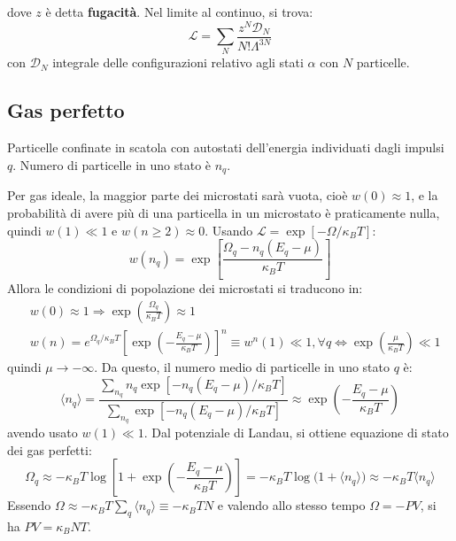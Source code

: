 \documentclass[10pt, a4paper]{scrartcl}
\numberwithin{equation}{subsection}
\theoremstyle{style1}
\begin{document}
dove $z$ \`e detta \textbf{fugacit\`a}. Nel limite al continuo, si trova:
\begin{equation}
	\mathscr{L}= \sum_{N}^{} \frac{z^N \mathscr{D}_N}{N! \Lambda ^{3N} }
\end{equation}
con $\mathscr{D}_N$ integrale delle configurazioni relativo agli stati $\alpha $ con $N$ particelle.


\subsection{Gas perfetto}
Particelle confinate in scatola con autostati dell'energia individuati dagli impulsi $q$. Numero di particelle in uno stato \`e $n_q$. 

Per gas ideale, la maggior parte dei microstati sar\`a vuota, cio\`e $w(0) \approx 1$, e la probabilit\`a di avere pi\`u di una particella in un microstato \`e praticamente nulla, quindi $w(1) \ll 1$ e $w(n\ge 2) \approx 0$. Usando $\mathscr{L} = \exp \left[ - \Omega / \kappa _B T \right] $:
\begin{equation}
	w(n_q) = \exp \left[ \frac{\Omega _q - n_q (E_q - \mu )}{\kappa _B T} \right] 
\end{equation}
Allora le condizioni di popolazione dei microstati si traducono in:
\begin{equation}
	\begin{split}
		&w(0) \approx 1 \Rightarrow \exp \left(\frac{\Omega _q}{\kappa _B T}\right) \approx 1\\
		&w(n) = e^{\Omega _q / \kappa _B T} \left[\exp \left(- \frac{E_q - \mu }{\kappa _BT} \right)\right]  ^n\equiv w^n(1)  \ll 1, \forall q \iff \exp \left(\frac{\mu}{\kappa _BT }\right) \ll 1
	\end{split}
\end{equation}
quindi $\mu \to -\infty$. Da questo, il numero medio di particelle in uno stato $q$ \`e:
\begin{equation}
	\langle n_q \rangle = \frac{\sum_{n_q}^{} n_q \exp\left[ -n_q (E_q - \mu ) / \kappa _BT \right] }{\sum_{n_q}^{}\exp\left[ -n_q (E_q - \mu ) / \kappa _BT \right]  } \approx \exp \left(- \frac{E_q - \mu }{\kappa _BT }\right) 
\end{equation}
avendo usato $w(1) \ll 1$. Dal potenziale di Landau, si ottiene equazione di stato dei gas perfetti:
\[
\Omega _q \approx -\kappa _B T \log \left[ 1 + \exp\left(- \frac{E_q - \mu }{\kappa _B T }\right)  \right] = -\kappa _B T \log \Big(1 + \langle n_q \rangle\Big) \approx -\kappa _B T \langle n_q \rangle
\] 
Essendo $\Omega \approx - \kappa _B T \sum_{q}^{} \langle n_q \rangle  \equiv -\kappa _B T N$ e valendo allo stesso tempo $\Omega = - PV$, si ha $PV = \kappa _B NT$.
\end{document}
